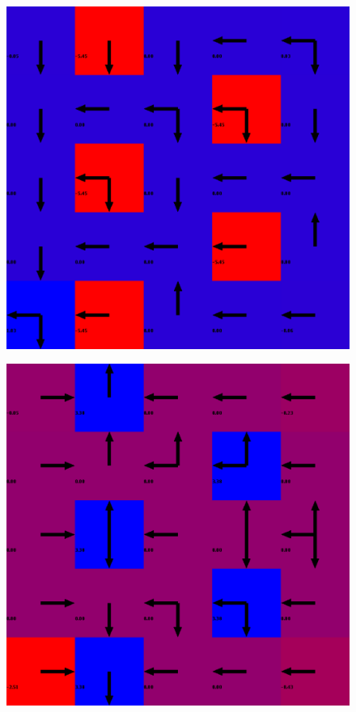 \begin{figure}
\begin{minipage}{0.22\textwidth}
\label{fig:test1}
\end{minipage}%
%
\hspace{0.033\textwidth}
%
\begin{minipage}{0.22\textwidth}
\includegraphics[width=1\columnwidth]{../2015_grant/figures/plus1minus1.pdf}
\label{fig:test2}
\end{minipage}%
%
\hspace{0.033\textwidth}
%
\begin{minipage}{0.22\textwidth}
\includegraphics[width=1\columnwidth]{../2015_grant/figures/minus1plus1.pdf}
\label{fig:test3}
\end{minipage}
\end{figure}
